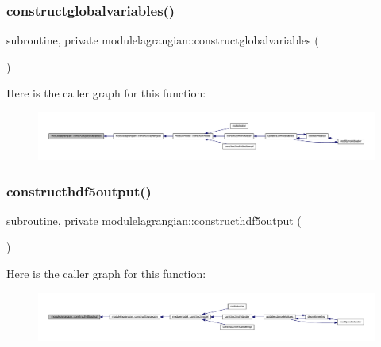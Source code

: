 \subsubsection{\texorpdfstring{constructglobalvariables()}{constructglobalvariables()}}
{\footnotesize\ttfamily subroutine, private modulelagrangian\+::constructglobalvariables (\begin{DoxyParamCaption}{ }\end{DoxyParamCaption})\hspace{0.3cm}{\ttfamily [private]}}

Here is the caller graph for this function\+:\nopagebreak
\begin{figure}[H]
\begin{center}
\leavevmode
\includegraphics[width=350pt]{namespacemodulelagrangian_aadb63f9fca438cc41d82d25d4e841aa6_icgraph}
\end{center}
\end{figure}
\mbox{\label{namespacemodulelagrangian_a95739a2a3f7752220aa5fe865d07c62b}} 
\subsubsection{\texorpdfstring{constructhdf5output()}{constructhdf5output()}}
{\footnotesize\ttfamily subroutine, private modulelagrangian\+::constructhdf5output (\begin{DoxyParamCaption}{ }\end{DoxyParamCaption})\hspace{0.3cm}{\ttfamily [private]}}

Here is the caller graph for this function\+:\nopagebreak
\begin{figure}[H]
\begin{center}
\leavevmode
\includegraphics[width=350pt]{namespacemodulelagrangian_a95739a2a3f7752220aa5fe865d07c62b_icgraph}
\end{center}
\end{figure}
\mbox{\label{namespacemodulelagrangian_ad766e71e7390a14dd30513d8ec8ca115}} 
